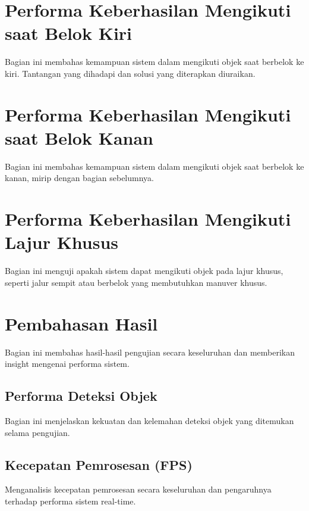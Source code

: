 \section{Performa Keberhasilan Mengikuti saat Belok Kiri}
\label{sec:performabelokkiri}

Bagian ini membahas kemampuan sistem dalam mengikuti objek saat berbelok ke kiri. Tantangan yang dihadapi dan solusi yang diterapkan diuraikan.

\section{Performa Keberhasilan Mengikuti saat Belok Kanan}
\label{sec:performabelokkanan}

Bagian ini membahas kemampuan sistem dalam mengikuti objek saat berbelok ke kanan, mirip dengan bagian sebelumnya.

\section{Performa Keberhasilan Mengikuti Lajur Khusus}
\label{sec:performalajurkhusus}

Bagian ini menguji apakah sistem dapat mengikuti objek pada lajur khusus, seperti jalur sempit atau berbelok yang membutuhkan manuver khusus.

\section{Pembahasan Hasil}
\label{sec:pembahasanhasil}

Bagian ini membahas hasil-hasil pengujian secara keseluruhan dan memberikan insight mengenai performa sistem.

\subsection{Performa Deteksi Objek}
\label{sec:performadeteksiobjek}

Bagian ini menjelaskan kekuatan dan kelemahan deteksi objek yang ditemukan selama pengujian.

\subsection{Kecepatan Pemrosesan (FPS)}
\label{sec:kecepatanpemrosesan}

Menganalisis kecepatan pemrosesan secara keseluruhan dan pengaruhnya terhadap performa sistem real-time.

